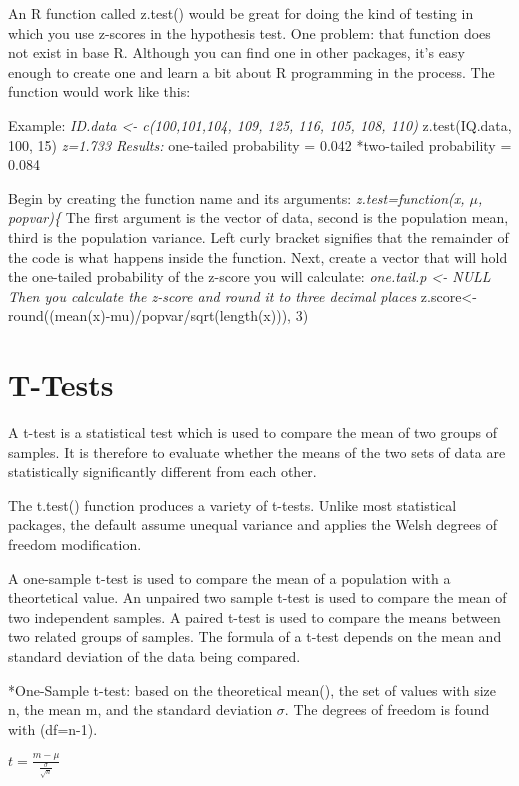 \documentclass[]{article}
\begin{document}
An R function called z.test() would be great for doing the kind of
testing in which you use z-scores in the hypothesis test. One problem:
that function does not exist in base R. Although you can find one in
other packages, it's easy enough to create one and learn a bit about R
programming in the process. The function would work like this:

Example: \emph{ID.data \textless{}- c(100,101,104, 109, 125, 116, 105,
108, 110) }z.test(IQ.data, 100, 15) \emph{z=1.733 Results: }one-tailed
probability = 0.042 *two-tailed probability = 0.084

Begin by creating the function name and its arguments:
\emph{z.test=function(x, \(\mu\), popvar)\{ }The first argument is the
vector of data, second is the population mean, third is the population
variance. Left curly bracket signifies that the remainder of the code is
what happens inside the function. Next, create a vector that will hold
the one-tailed probability of the z-score you will calculate:
\emph{one.tail.p \textless{}- NULL Then you calculate the z-score and
round it to three decimal places }z.score\textless{}-
round((mean(x)-mu)/popvar/sqrt(length(x))), 3)

\hypertarget{t-tests}{%
\section{T-Tests}\label{t-tests}}

A t-test is a statistical test which is used to compare the mean of two
groups of samples. It is therefore to evaluate whether the means of the
two sets of data are statistically significantly different from each
other.

The t.test() function produces a variety of t-tests. Unlike most
statistical packages, the default assume unequal variance and applies
the Welsh degrees of freedom modification.

A one-sample t-test is used to compare the mean of a population with a
theortetical value. An unpaired two sample t-test is used to compare the
mean of two independent samples. A paired t-test is used to compare the
means between two related groups of samples. The formula of a t-test
depends on the mean and standard deviation of the data being compared.

*One-Sample t-test: based on the theoretical mean(\mu), the set of
values with size n, the mean m, and the standard deviation \(\sigma\).
The degrees of freedom is found with (df=n-1).

\(t = \frac{m-\mu}{\frac{\sigma}{\sqrt{n}}}\)
\end{document}
